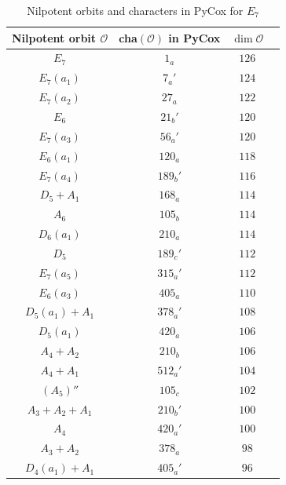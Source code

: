 \documentclass[reqno,12pt]{amsart}
\numberwithin{equation}{section}
\theoremstyle{plain}
\theoremstyle{definition}
\begin{document}

\begin{table}[htbp]\caption{Nilpotent orbits and characters in PyCox for $ E_7$ }
	\label{tabchare7-0}
	\centering
	\renewcommand{\arraystretch}{1.3}
	\setlength\tabcolsep{5pt}
{	\begin{tabular}{|c|c|c|c|}
		\hline   Nilpotent orbit $\mathcal{O}$ & cha$(\mathcal{O})$ in PyCox & $\dim \mathcal{O}$ \\ \hline
 $E_7$& $1_a$& $126$\\\hline
 $E_{7}(a_1)$& $7_a'$& $124$\\\hline
 $E_{7}(a_2)$& $27_a$& $122$\\\hline
 $E_{6}$& $21_b'$& $120$\\
 $E_{7}(a_3)$& $56_a'$& $120$\\\hline
 $E_{6}(a_1)$& $120_a$& $118$\\\hline
 $E_{7}(a_4)$& $189_b'$& $116$\\\hline
 $D_5+A_1$& $168_a$& $114$\\
 $A_6$& $105_b$& $114$\\
 $D_6(a_1)$& $210_a$& $114$\\\hline
  $D_5$  &  $ 189_c'$  & $112$ \\
  $E_7(a_5)$  &  $ 315_a'$  & $112$ \\\hline
  $E_6(a_3)$  &  $ 405_a$  & $110$ \\
\hline
  $D_5(a_1)+A_1$  &  $ 378_a'$  & $108$ \\
\hline
  $D_5(a_1)$  &  $ 420_a$  & $106$ \\
  $A_4+A_2$  &  $ 210_b$  & $106$ \\
\hline
  $A_4+A_1$  &  $ 512_a'$  & $104$ \\
\hline
  $(A_5)''$  &  $ 105_c$  & $102$ \\
\hline
  $A_3+A_2+A_1$  &  $ 210_b'$  & $100$ \\
  $A_4$  &  $ 420_a'$  & $100$ \\
\hline
  $A_3+A_2$  &  $ 378_a$  & $98$ \\
\hline
  $D_4(a_1)+A_1$  &  $ 405_a'$  & $96$ \\


\end{tabular}}
\end{table}
\end{document}
